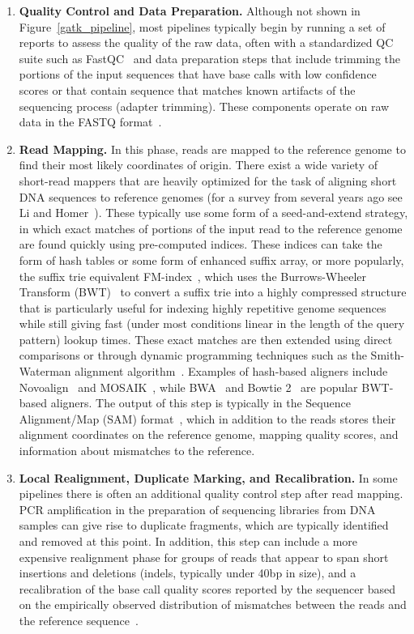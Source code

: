 \begin{enumerate}
\item \textbf{Quality Control and Data Preparation.} Although not shown in Figure~\ref{gatk_pipeline}, most pipelines typically begin by running a set of reports to assess the quality of the raw data, often with a standardized QC suite such as FastQC~\cite{fastqc} and data preparation steps that include trimming the portions of the input sequences that have base calls with low confidence scores or that contain sequence that matches known artifacts of the sequencing process (adapter trimming). These components operate on raw data in the FASTQ format~\cite{Cock:2010ky}.

\item \textbf{Read Mapping.} In this phase, reads are mapped to the reference genome to find their most likely coordinates of origin. There exist a wide variety of short-read mappers that are heavily optimized for the task of aligning short DNA sequences to reference genomes (for a survey from several years ago see Li and Homer~\cite{Li:2010p10}). These typically use some form of a seed-and-extend strategy, in which exact matches of portions of the input read to the reference genome are found quickly using pre-computed indices. These indices can take the form of hash tables or some form of enhanced suffix array, or more popularly, the suffix trie equivalent FM-index~\cite{Ferragina:2000vl}, which uses the Burrows-Wheeler Transform (BWT)~\cite{Lossless94ablock-sorting} to convert a suffix trie into a highly compressed structure that is particularly useful for indexing highly repetitive genome sequences while still giving fast (under most conditions linear in the length of the query pattern) lookup times. These exact matches are then extended using direct comparisons or through dynamic programming techniques such as the Smith-Waterman alignment algorithm~\cite{Smith:1981up}. Examples of hash-based aligners include Novoalign~\cite{novoalign} and MOSAIK~\cite{2013arXiv1309.1149L}, while BWA~\cite{Li:2009p836} and Bowtie 2~\cite{Langmead:2012jh} are popular BWT-based aligners. The output of this step is typically in the Sequence Alignment/Map (SAM) format~\cite{Li:2009vz}, which in addition to the reads stores their alignment coordinates on the reference genome, mapping quality scores, and information about mismatches to the reference.

\item \textbf{Local Realignment, Duplicate Marking, and Recalibration.} In some pipelines there is often an additional quality control step after read mapping. PCR amplification in the preparation of sequencing libraries from DNA samples can give rise to duplicate fragments, which are typically identified and removed at this point. In addition, this step can include a more expensive realignment phase for groups of reads that appear to span short insertions and deletions (indels, typically under 40bp in size), and a recalibration of the base call quality scores reported by the sequencer based on the empirically observed distribution of mismatches between the reads and the reference sequence~\cite{DePristo:2011fo}.


\end{enumerate}
